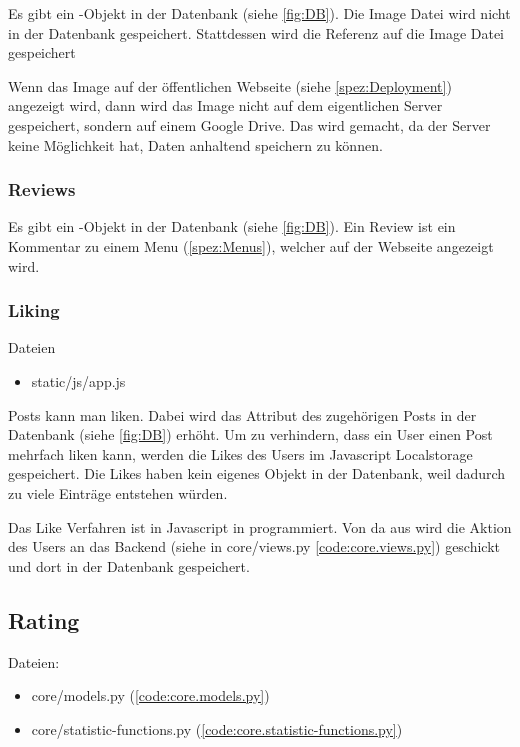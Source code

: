 Es gibt ein -Objekt in der Datenbank (siehe \ref{fig:DB}). Die Image
Datei wird nicht in der Datenbank gespeichert. Stattdessen wird die Referenz auf
die Image Datei gespeichert

Wenn das Image auf der öffentlichen Webseite (siehe \ref{spez:Deployment})
angezeigt wird, dann wird das Image nicht auf dem eigentlichen Server
gespeichert, sondern auf einem Google Drive. Das wird gemacht, da der Server
keine Möglichkeit hat, Daten anhaltend speichern zu können.

\subsubsection{Reviews} \label{spez:Reviews}

Es gibt ein -Objekt in der Datenbank (siehe \ref{fig:DB}). Ein
Review ist ein Kommentar zu einem Menu (\ref{spez:Menus}), welcher auf der
Webseite angezeigt wird.

\subsubsection{Liking} \label{spez:Liking} Dateien
\begin{itemize}
    \item static/js/app.js
\end{itemize}

Posts kann man liken. Dabei wird das  Attribut des zugehörigen Posts
in der Datenbank (siehe \ref{fig:DB}) erhöht. Um zu verhindern, dass ein User
einen Post mehrfach liken kann, werden die Likes des Users im Javascript
Localstorage gespeichert. Die Likes haben kein eigenes Objekt in der Datenbank,
weil dadurch zu viele Einträge entstehen würden.

Das Like Verfahren ist in Javascript in  programmiert.
Von da aus wird die Aktion des Users an das Backend (siehe  in
core/views.py \ref{code:core.views.py}) geschickt und dort in der Datenbank
gespeichert.

\subsection{Rating} \label{spez:Rating}

Dateien:
\begin{itemize}
    \item core/models.py (\ref{code:core.models.py})
    \item core/statistic-functions.py (\ref{code:core.statistic-functions.py})
\end{itemize}

